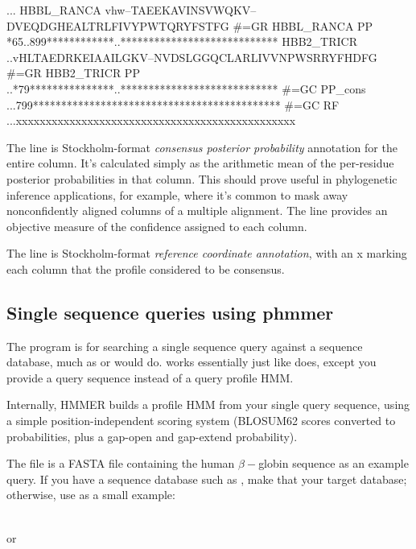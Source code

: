 \begin{sreoutput}
...
HBBL_RANCA         vhw--TAEEKAVINSVWQKV--DVEQDGHEALTRLFIVYPWTQRYFSTFG
#=GR HBBL_RANCA PP *65..899************..****************************
HBB2_TRICR         ..vHLTAEDRKEIAAILGKV--NVDSLGGQCLARLIVVNPWSRRYFHDFG
#=GR HBB2_TRICR PP ..*79***************..****************************
#=GC PP_cons       ...799********************************************
#=GC RF            ...xxxxxxxxxxxxxxxxxxxxxxxxxxxxxxxxxxxxxxxxxxxxxxx
\end{sreoutput}

The  line is Stockholm-format \emph{consensus
posterior probability} annotation for the entire column. It's
calculated simply as the arithmetic mean of the per-residue posterior
probabilities in that column. This should prove useful in phylogenetic
inference applications, for example, where it's common to mask away
nonconfidently aligned columns of a multiple alignment. The
 line provides an objective measure of the confidence
assigned to each column.

The  line is Stockholm-format \emph{reference
  coordinate annotation}, with an x marking each column that the
profile considered to be consensus.

\subsection{Single sequence queries using phmmer}

The  program is for searching a single sequence query
against a sequence database, much as  or 
would do.  works essentially just like 
does, except you provide a query sequence instead of a query profile
HMM. 

Internally, HMMER builds a profile HMM from your single query
sequence, using a simple position-independent scoring system (BLOSUM62
scores converted to probabilities, plus a gap-open and gap-extend
probability).

The file  is a FASTA file containing the
human $\beta-$globin sequence as an example query. If you have a
sequence database such as , make that your
target database; otherwise, use  as a
small example:

\\
or\\

